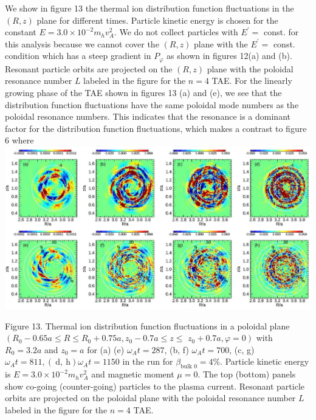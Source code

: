\documentclass[10pt]{article}
\begin{document}
We show in figure 13 the thermal ion distribution function fluctuations in the $(R, z)$ plane for different times. Particle kinetic energy is chosen for the constant $E=3.0 \times 10^{-2} m_{h} v_{A}^{2}$. We do not collect particles with $E^{\prime}=$ const. for this analysis because we cannot cover the $(R, z)$ plane with the $E^{\prime}=$ const. condition which has a steep gradient in $P_{\varphi}$ as shown in figures 12(a) and (b). Resonant particle orbits are projected on the $(R, z)$ plane with the poloidal resonance number $L$ labeled in the figure for the $n=4$ TAE. For the linearly growing phase of the TAE shown in figures 13 (a) and (e), we see that the distribution function fluctuations have the same poloidal mode numbers as the poloidal resonance numbers. This indicates that the resonance is a dominant factor for the distribution function fluctuations, which makes a contrast to figure 6 where
\includegraphics[max width=\textwidth, center]{2023_06_04_de2f4b8aa3fd859f006dg-13}

Figure 13. Thermal ion distribution function fluctuations in a poloidal plane $\left(R_{0}-0.65 a \leqslant R \leqslant R_{0}+0.75 a, z_{0}-0.7 a \leqslant z \leqslant\right.$ $\left.z_{0}+0.7 a, \varphi=0\right)$ with $R_{0}=3.2 a$ and $z_{0}=a$ for (a) (e) $\omega_{A} t=287$, (b, f) $\omega_{A} t=700$, (c, g) $\omega_{A} t=811,(\mathrm{~d}, \mathrm{~h}) \omega_{A} t=1150$ in the run for $\beta_{\text {bulk } 0}=4 \%$. Particle kinetic energy is $E=3.0 \times 10^{-2} m_{h} v_{A}^{2}$ and magnetic moment $\mu=0$. The top (bottom) panels show co-going (counter-going) particles to the plasma current. Resonant particle orbits are projected on the poloidal plane with the poloidal resonance number $L$ labeled in the figure for the $n=4$ TAE.
\end{document}
